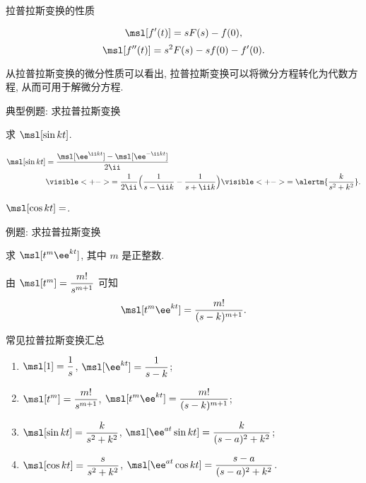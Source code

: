 \begin{frame}{拉普拉斯变换的性质}
	\onslide<+->
	\begin{theorem*}[][微分性质]
	\[
		\msl[f'(t)]=sF(s)-f(0),
	\]
	\[
		\msl[f''(t)]=s^2F(s)-sf(0)-f'(0).
	\]
	\end{theorem*}
	\onslide<+->
	从拉普拉斯变换的微分性质可以看出, 拉普拉斯变换可以将微分方程转化为代数方程, 从而可用于解微分方程.
\end{frame}


\begin{frame}{典型例题: 求拉普拉斯变换}
	\onslide<+->
	\begin{example}[nearnext]
		求 $\msl[\sin{kt}]$.
	\end{example}
	\onslide<+->
	\begin{solution}[nearprev]
		\begin{align*}
			\msl[\sin{kt}]&=\frac{\msl[\ee^{\ii kt}]-\msl[\ee^{-\ii kt}]}{2\ii}\\
			&\visible<+->{=\frac1{2\ii}\Bigl(\frac1{s-\ii k}-\frac1{s+\ii k}\Bigr)}
			\visible<+->{=\alertm{\frac k{s^2+k^2}}.}
		\end{align*}
	\end{solution}
	\onslide<+->
	\begin{exercise}
		$\msl[\cos{kt}]=$.
	\end{exercise}
\end{frame}


\begin{frame}{例题: 求拉普拉斯变换}
	\onslide<+->
	\begin{example}[nearnext]
		求 $\msl[t^m\ee^{kt}]$, 其中 $m$ 是正整数.
	\end{example}
	\onslide<+->
	\begin{solution}[nearprev]
		由 $\msl[t^m]=\dfrac{m!}{s^{m+1}}$ 可知
		\[
			\msl[t^m\ee^{kt}]=\frac{m!}{(s-k)^{m+1}}.
		\]
	\end{solution}
\end{frame}


\begin{frame}{常见拉普拉斯变换汇总}
	\onslide<+->
	\begin{theorem*}[][与有理函数有关的拉普拉斯变换汇总]
		\begin{enumerate}
			\item $\displaystyle\msl[1]=\frac1s$, 
			$\displaystyle \msl[\ee^{kt}]=\frac1{s-k}$;
			\item $\displaystyle\msl[t^m]=\frac{m!}{s^{m+1}}$, 
			$\displaystyle\msl[t^m\ee^{kt}]=\frac{m!}{(s-k)^{m+1}}$;
			\item $\displaystyle\msl[\sin kt]=\frac{k}{s^2+k^2}$, 
			$\displaystyle\msl[\ee^{at}\sin kt]=\frac{k}{(s-a)^2+k^2}$;
			\item $\displaystyle\msl[\cos kt]=\frac{s}{s^2+k^2}$,
			$\displaystyle\msl[\ee^{at}\cos kt]=\frac{s-a}{(s-a)^2+k^2}$.
		\end{enumerate}
	\end{theorem*}
\end{frame}


